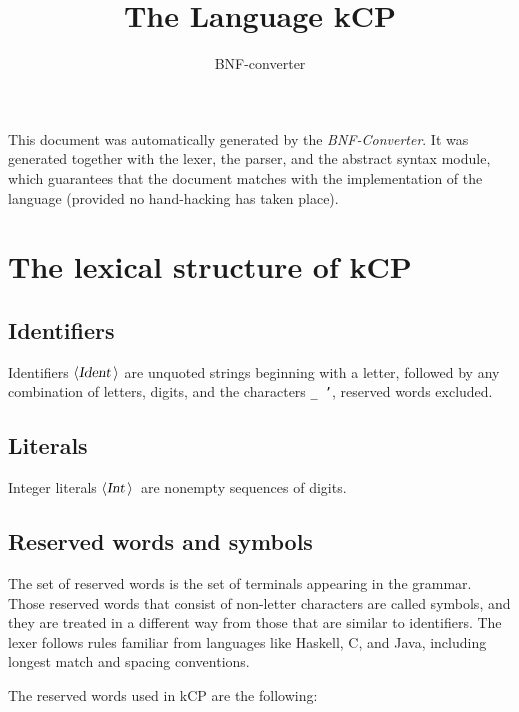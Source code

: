 \documentclass[a4paper,11pt]{article}
\author{BNF-converter}
\title{The Language kCP}
\begin{document}
\maketitle

\newcommand{\emptyP}{\mbox{$\epsilon$}}
\newcommand{\terminal}[1]{\mbox{{\texttt {#1}}}}
\newcommand{\nonterminal}[1]{\mbox{$\langle \mbox{{\sl #1 }} \! \rangle$}}
\newcommand{\arrow}{\mbox{::=}}
\newcommand{\delimit}{\mbox{$|$}}
\newcommand{\reserved}[1]{\mbox{{\texttt {#1}}}}
\newcommand{\literal}[1]{\mbox{{\texttt {#1}}}}
\newcommand{\symb}[1]{\mbox{{\texttt {#1}}}}

This document was automatically generated by the {\em BNF-Converter}. It was generated together with the lexer, the parser, and the abstract syntax module, which guarantees that the document matches with the implementation of the language (provided no hand-hacking has taken place).

\section*{The lexical structure of kCP}
\subsection*{Identifiers}
Identifiers \nonterminal{Ident} are unquoted strings beginning with a letter,
followed by any combination of letters, digits, and the characters {\tt \_ '},
reserved words excluded.


\subsection*{Literals}
Integer literals \nonterminal{Int}\ are nonempty sequences of digits.




\subsection*{Reserved words and symbols}
The set of reserved words is the set of terminals appearing in the grammar. Those reserved words that consist of non-letter characters are called symbols, and they are treated in a different way from those that are similar to identifiers. The lexer follows rules familiar from languages like Haskell, C, and Java, including longest match and spacing conventions.

The reserved words used in kCP are the following: \\
\end{document}
